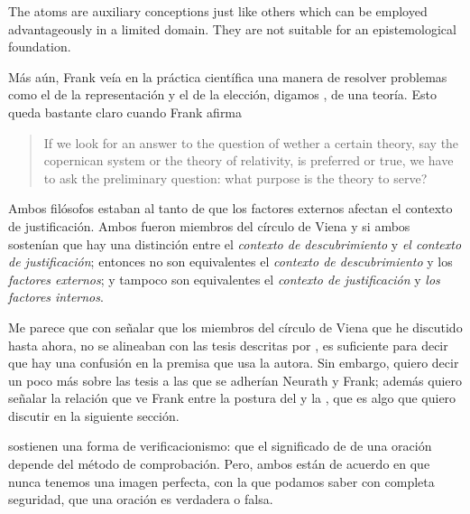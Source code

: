The  atoms are auxiliary conceptions just like others which  can be employed advantageously in a limited domain.  They are not suitable for an epistemological foundation.

Más aún, Frank veía en la práctica científica una manera de resolver problemas como el de la representación y el de la elección, digamos , de una teoría.
Esto queda bastante claro cuando Frank afirma

\begin{quote}
	If we look for an answer to the question of wether a certain theory, say the copernican system or the theory of relativity, is preferred or true, we have to ask the preliminary question: what purpose is the theory to serve? \parencite[p. 15]{Frank1954}
\end{quote}

Ambos filósofos estaban al tanto de que los factores externos afectan el contexto de justificación.
Ambos fueron miembros del círculo de Viena y si ambos sostenían que hay una distinción entre el \emph{contexto de descubrimiento} y \emph{el contexto de justificación}; entonces no son equivalentes el \emph{contexto de descubrimiento} y los \emph{factores externos}; y  tampoco son equivalentes el \emph{contexto de justificación} y \emph{los factores internos}.

Me parece que con señalar que los miembros del círculo de Viena que he discutido hasta ahora, no se alineaban con las tesis descritas por \parencite{Yturbe1995}, es suficiente para decir que hay una confusión en la premisa que usa la autora.
Sin embargo, quiero decir un poco más sobre las tesis a las que se adherían Neurath y Frank; además quiero señalar la relación que ve Frank entre la postura del  y la , que es algo que quiero discutir en la siguiente sección.

 sostienen una forma de verificacionismo: que el significado de de una oración depende del método de comprobación.
Pero, ambos están de acuerdo en que nunca tenemos una imagen perfecta, con la que podamos saber con completa seguridad, que una oración es verdadera o falsa.





